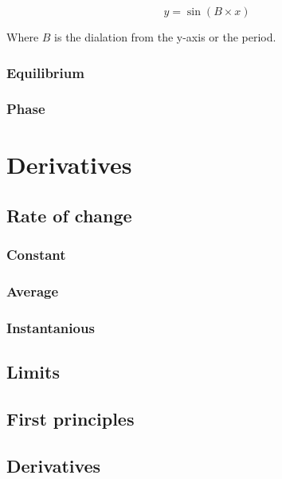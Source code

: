 \documentclass{book}
\newenvironment{explanationOfTerms}{}{}
\begin{document}
\[
	y = \sin(B \times x)
\]

\begin{explanationOfTerms}
	Where $B$ is the dialation from the y-axis or the period.
\end{explanationOfTerms}


\subsection{Equilibrium}


\subsection{Phase}




\chapter{Derivatives}
\section{Rate of change}
\subsection{Constant}


\subsection{Average}


\subsection{Instantanious}



\section{Limits}



\section{First principles}



\section{Derivatives}
\end{document}
